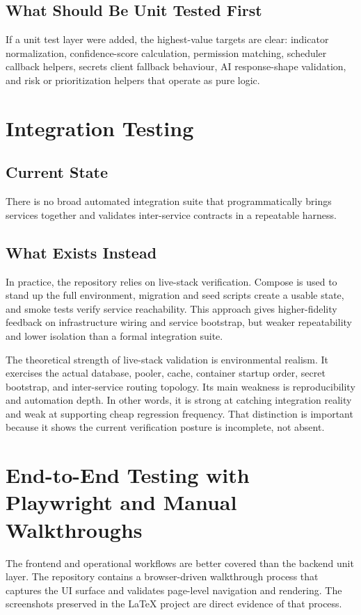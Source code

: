 \subsection{What Should Be Unit Tested First}
If a unit test layer were added, the highest-value targets are clear: indicator normalization, confidence-score calculation, permission matching, scheduler callback helpers, secrets client fallback behaviour, AI response-shape validation, and risk or prioritization helpers that operate as pure logic.

\section{Integration Testing}
\subsection{Current State}
There is no broad automated integration suite that programmatically brings services together and validates inter-service contracts in a repeatable harness.

\subsection{What Exists Instead}
In practice, the repository relies on live-stack verification. Compose is used to stand up the full environment, migration and seed scripts create a usable state, and smoke tests verify service reachability. This approach gives higher-fidelity feedback on infrastructure wiring and service bootstrap, but weaker repeatability and lower isolation than a formal integration suite.

The theoretical strength of live-stack validation is environmental realism. It exercises the actual database, pooler, cache, container startup order, secret bootstrap, and inter-service routing topology. Its main weakness is reproducibility and automation depth. In other words, it is strong at catching integration reality and weak at supporting cheap regression frequency. That distinction is important because it shows the current verification posture is incomplete, not absent.

\section{End-to-End Testing with Playwright and Manual Walkthroughs}
The frontend and operational workflows are better covered than the backend unit layer. The repository contains a browser-driven walkthrough process that captures the UI surface and validates page-level navigation and rendering. The screenshots preserved in the LaTeX project are direct evidence of that process.

